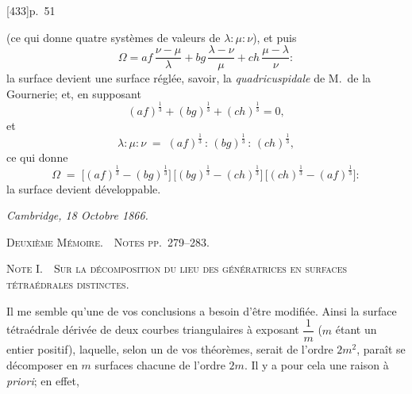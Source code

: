\documentclass[11pt,a4paper]{article}
\begin{document}


\begin{flushright}\small [433]\quad p.~51\end{flushright}


\noindent
(ce qui donne quatre syst\`emes de valeurs de $\lambda : \mu : \nu$), et puis
\[
\Omega = af\,\frac{\nu - \mu}{\lambda} + bg\,\frac{\lambda - \nu}{\mu}
        + ch\,\frac{\mu - \lambda}{\nu} :
\]
la surface devient une surface r\'egl\'ee, savoir, la \textit{quadricuspidale} de
M.\ de la Gournerie; et, en supposant
\[
(af)^{\tfrac{1}{3}} + (bg)^{\tfrac{1}{3}} + (ch)^{\tfrac{1}{3}} = 0,
\]
et
\[
\lambda : \mu : \nu \;=\; (af)^{\tfrac{1}{3}} \,:\, (bg)^{\tfrac{1}{3}}
                    \,:\, (ch)^{\tfrac{1}{3}},
\]
ce qui donne
\[
\Omega \;=\; \bigl[(af)^{\tfrac{1}{3}} - (bg)^{\tfrac{1}{3}}\bigr]\,
             \bigl[(bg)^{\tfrac{1}{3}} - (ch)^{\tfrac{1}{3}}\bigr]\,
             \bigl[(ch)^{\tfrac{1}{3}} - (af)^{\tfrac{1}{3}}\bigr] :
\]
la surface devient d\'eveloppable.

\begin{flushright}
\textit{Cambridge, 18 Octobre 1866.}
\end{flushright}

\bigskip

\begin{center}
\textsc{Deuxi\`eme M\'emoire.\ \ Notes pp.~279--283.}
\end{center}

\medskip\noindent
\textsc{Note I.\ \ Sur la d\'ecomposition du lieu des g\'en\'eratrices en surfaces
t\'etra\'edrales distinctes.}
\medskip

Il me semble qu'une de vos conclusions a besoin d'\^etre modifi\'ee. Ainsi la
surface t\'etra\'edrale d\'eriv\'ee de deux courbes triangulaires \`a exposant
$\dfrac{1}{m}$ ($m$ \'etant un entier positif), laquelle, selon un de vos
th\'eor\`emes, serait de l'ordre $2m^2$, para\^it se d\'ecomposer en $m$
surfaces chacune de l'ordre $2m$. Il y a pour cela une raison \`a \textit{priori};
en effet,
\end{document}
